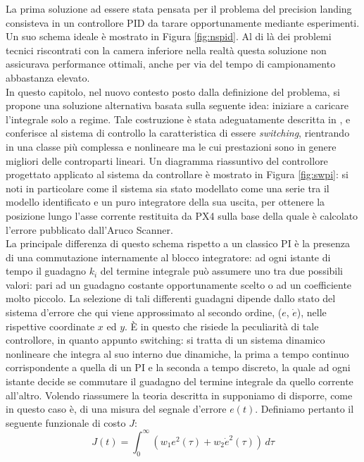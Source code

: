 \indent La prima soluzione ad essere stata pensata per il problema del precision landing consisteva in un controllore PID da tarare opportunamente mediante esperimenti. Un suo schema ideale è mostrato in Figura \ref{fig:nspid}. Al di là dei problemi tecnici riscontrati con la camera inferiore nella realtà questa soluzione non assicurava performance ottimali, anche per via del tempo di campionamento abbastanza elevato.\\
In questo capitolo, nel nuovo contesto posto dalla definizione del problema, si propone una soluzione alternativa basata sulla seguente idea: iniziare a caricare l'integrale solo a regime. Tale costruzione è stata adeguatamente descritta in \cite{pisw}, e conferisce al sistema di controllo la caratteristica di essere \emph{switching}, rientrando in una classe più complessa e nonlineare ma le cui prestazioni sono in genere migliori delle controparti lineari. Un diagramma riassuntivo del controllore progettato applicato al sistema da controllare è mostrato in Figura \ref{fig:swpi}: si noti in particolare come il sistema sia stato modellato come una serie tra il modello identificato e un puro integratore della sua uscita, per ottenere la posizione lungo l'asse corrente restituita da PX4 sulla base della quale è calcolato l'errore pubblicato dall'Aruco Scanner.\\
La principale differenza di questo schema rispetto a un classico PI è la presenza di una commutazione internamente al blocco integratore: ad ogni istante di tempo il guadagno $k_i$ del termine integrale può assumere uno tra due possibili valori: pari ad un guadagno costante opportunamente scelto o ad un coefficiente molto piccolo. La selezione di tali differenti guadagni dipende dallo stato del sistema d'errore che qui viene approssimato al secondo ordine, ($e$, $\dot e$), nelle rispettive coordinate $x$ ed $y$. È in questo che risiede la peculiarità di tale controllore, in quanto appunto switching: si tratta di un sistema dinamico nonlineare che integra al suo interno due dinamiche, la prima a tempo continuo corrispondente a quella di un PI e la seconda a tempo discreto, la quale ad ogni istante decide se commutare il guadagno del termine integrale da quello corrente all'altro. Volendo riassumere la teoria descritta in \cite{pisw} supponiamo di disporre, come in questo caso è, di una misura del segnale d'errore $e(t)$. Definiamo pertanto il seguente funzionale di costo $J$:
\begin{equation}
    J(t) = \int_{0}^{\infty} (w_1e^2(\tau) + w_2\dot{e}^2(\tau)) \,d\tau
\end{equation}
